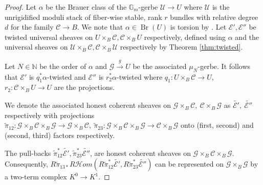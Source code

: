 \documentclass[11pt]{amsart}
\theoremstyle{definition}
\newcommand{\ri}{\rightarrow}
\newcommand{\U}{\mathscr{U}}
\newcommand{\e}{\mathcal{E}}
\newcommand{\mC}{\mathcal{C}}
\newcommand{\gm}{\mathbb{G}_m}
\begin{document}
\begin{proof}
Let $\alpha$ be the Brauer class of the $\gm$-gerbe $\U\ri U$ where $\U$ is the unrigidified moduli stack of fiber-wise stable, rank $r$ bundles with relative degree $d$ for the family $\mC\ri B$. We note that $\alpha \in \operatorname{Br}(U)$ is torsion by \cite[Theorem B]{brauer}.
Let $\mathcal E', \mathcal{E''}$ be twisted universal sheaves on $U\times_B \mathcal C, \mC\times_B U$ respectively, defined using $\alpha$ and the universal sheaves on $\U\times_B\mC, \mC\times_B\U $ respectively by Theorem \ref{thm:twisted}. 

Let $ N\in \mathbb N$ be the order of $\alpha$ and $\mathcal G\xrightarrow{g} U$ be the associated $\mu_N$-gerbe.
   It follows that $\mathcal E'$ is $q_1^*\alpha$-twisted and $\mathcal E''$ is $r_2^* \alpha$-twisted where $q_1: U\times_B \mathcal C \rightarrow U$, $r_2: \mathcal C\times_B U\rightarrow U$ are the projections. 

   We denote the associated honest coherent sheaves on $\mathcal{G}\times_B\mC, \ \mC\times_B \mathcal{G}$ as $\tilde{\e'}, \ \tilde{\e''}$ respectively with projections
   $\tilde{\pi}_{12}:\mathcal G\times_B \mathcal C \times_B \mathcal G\ri \mathcal G\times_B \mathcal C , \ \tilde{\pi}_{23}: \mathcal G\times_B \mathcal C \times_B \mathcal G\ri  \mathcal C \times_B \mathcal G$ onto (first, second) and (second, third) factors respectively.
   
   
 The pull-backs $\tilde{\pi}_{12}^*\tilde{\e'}, \tilde{\pi}_{23}^*\tilde{\e''}$, are honest coherent sheaves on $\mathcal G\times_B \mathcal C \times_B \mathcal G$.   Consequently,  $R {{\tilde \pi}_{13*}}R\mathscr Hom \left (R{\tilde \pi}_{12}^* \tilde {\mathcal E'} , R\tilde \pi_{23}^*\tilde{\mathcal E''}  \right )$ can be represented on $\mathcal G\times_B \mathcal G$ by a two-term complex $K^0\rightarrow K^1$. 
   

\end{proof}
\end{document}
